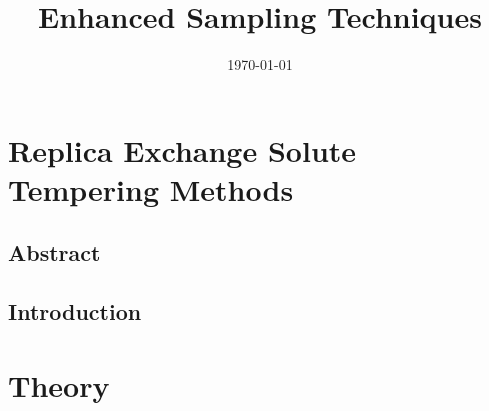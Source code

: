 \documentclass{memoir}
\title{Enhanced Sampling Techniques}
\begin{document}
\date{\today}

\maketitle

\tableofcontents

\chapter{Replica Exchange Solute Tempering Methods}
\section{Abstract}


\section{Introduction}

  
\chapter{Theory} 




\end{document}
